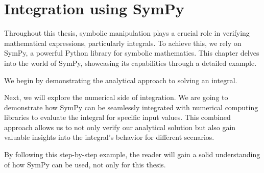 \chapter{Integration using SymPy}\label{ch:intsympy}

Throughout this thesis, symbolic manipulation plays a crucial role in verifying mathematical expressions, particularly integrals.
To achieve this, we rely on SymPy\cite{10.7717/peerj-cs.103}, a powerful Python library for symbolic mathematics.
This chapter delves into the world of SymPy\cite{10.7717/peerj-cs.103}, showcasing its capabilities through a detailed example.

We begin by demonstrating the analytical approach to solving an integral.

Next, we will explore the numerical side of integration.
We are going to demonstrate how SymPy\cite{10.7717/peerj-cs.103} can be seamlessly integrated with numerical computing libraries to evaluate the integral for specific input values.
This combined approach allows us to not only verify our analytical solution but also gain valuable insights into the integral's behavior for different scenarios.

By following this step-by-step example, the reader will gain a solid understanding of how SymPy\cite{10.7717/peerj-cs.103} can be used, not only for this thesis.




